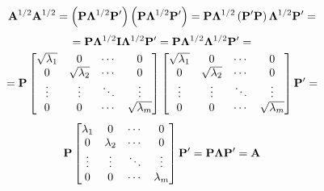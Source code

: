 \begin{enumerate}
            \[
                \bold{A}^{1/2}\bold{A}^{1/2} = 
                \left(\bold{P}\bold{\Lambda}^{1/2}\bold{P}^\prime\right)\left(\bold{P}\bold{\Lambda}^{1/2}\bold{P}^\prime\right)
                =
                \bold{P}\bold{\Lambda}^{1/2}\left(\bold{P}^\prime\bold{P}\right)\bold{\Lambda}^{1/2}\bold{P}^\prime
                =
            \]
            \[
                =
                \bold{P}\bold{\Lambda}^{1/2}\bold{I}\bold{\Lambda}^{1/2}\bold{P}^\prime
                =
                \bold{P}\bold{\Lambda}^{1/2}\bold{\Lambda}^{1/2}\bold{P}^\prime
                =
            \]
            \[
                =
                \bold{P}
                \begin{bmatrix}
                    \sqrt{\lambda_1} & 0 & \cdots & 0 \\
                    0 & \sqrt{\lambda_2} & \cdots & 0 \\
                    \vdots & \vdots & \ddots & \vdots \\
                    0 & 0 & \cdots & \sqrt{\lambda_m}
                \end{bmatrix}
                \begin{bmatrix}
                    \sqrt{\lambda_1} & 0 & \cdots & 0 \\
                    0 & \sqrt{\lambda_2} & \cdots & 0 \\
                    \vdots & \vdots & \ddots & \vdots \\
                    0 & 0 & \cdots & \sqrt{\lambda_m}
                \end{bmatrix}
                \bold{P}^\prime
                =
            \]
            \[
                \bold{P}
                \begin{bmatrix}
                    \lambda_1 & 0 & \cdots & 0 \\
                    0 & \lambda_2 & \cdots & 0 \\
                    \vdots & \vdots & \ddots & \vdots \\
                    0 & 0 & \cdots & \lambda_m
                \end{bmatrix}
                \bold{P}^\prime
                =
                \bold{P}
                \bold{\Lambda}
                \bold{P}^\prime
                =
                \bold{A}
            \]


\end{enumerate}
